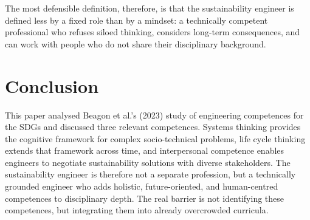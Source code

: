 \documentclass[11pt, a4paper]{article}
\begin{document}
The most defensible definition, therefore, is that the  sustainability engineer is
defined less by a fixed role than by a mindset: a technically competent professional who refuses
siloed thinking, considers long-term consequences, and can work with people who do not share their
disciplinary background.

\newpage
\section{Conclusion}
This paper analysed Beagon et al.'s (2023) study of engineering competences for the SDGs and discussed
three relevant competences. Systems thinking provides the cognitive framework for complex
socio-technical problems, life cycle thinking extends that framework across time, and interpersonal
competence enables engineers to negotiate sustainability solutions with diverse stakeholders. The
 sustainability engineer is therefore not a separate profession, but a technically
grounded engineer who adds holistic, future-oriented, and human-centred competences to disciplinary
depth\cite{beagon2023preparing}. The real barrier is not identifying these competences, but
integrating them into already overcrowded curricula.

\newpage
\printbibliography[
  heading=bibintoc,
  title={References}
]
\end{document}
